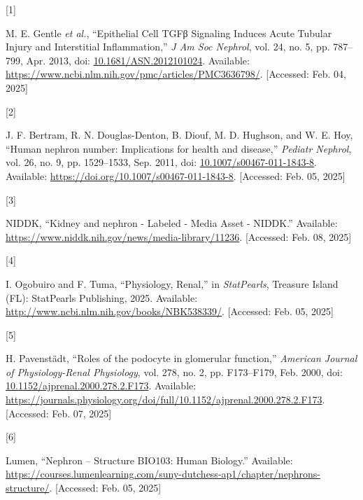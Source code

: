 \documentclass[
  paper=a4,
  ,captions=tableheading
]{scrartcl}
\newlength{\cslhangindent}
\newlength{\csllabelwidth}
\newenvironment{CSLReferences}[2] %
  {\begin{list}{}{%
   \setlength{\itemindent}{0pt}
   \setlength{\leftmargin}{0pt}
   \setlength{\parsep}{0pt}
   \ifodd #1
    \setlength{\leftmargin}{\cslhangindent}
    \setlength{\itemindent}{-1\cslhangindent}
   \fi
   \setlength{\itemsep}{#2\baselineskip}}}
  {\end{list}}
\newcommand{\CSLLeftMargin}[1]{\parbox[t]{\csllabelwidth}{\strut#1\strut}}
\newcommand{\CSLRightInline}[1]{\parbox[t]{\linewidth - \csllabelwidth}{\strut#1\strut}}
\begin{document}
\protect{}\label{refs}
\begin{CSLReferences}{0}{0}
\CSLLeftMargin{{[}1{]} }%
\CSLRightInline{M. E. Gentle \emph{et al.}, {``Epithelial {Cell TGFβ
Signaling Induces Acute Tubular Injury} and {Interstitial
Inflammation},''} \emph{J Am Soc Nephrol}, vol. 24, no. 5, pp. 787--799,
Apr. 2013, doi:
\href{https://doi.org/10.1681/ASN.2012101024}{10.1681/ASN.2012101024}.
Available: \url{https://www.ncbi.nlm.nih.gov/pmc/articles/PMC3636798/}.
{[}Accessed: Feb. 04, 2025{]}}

\CSLLeftMargin{{[}2{]} }%
\CSLRightInline{J. F. Bertram, R. N. Douglas-Denton, B. Diouf, M. D.
Hughson, and W. E. Hoy, {``Human nephron number: Implications for health
and disease,''} \emph{Pediatr Nephrol}, vol. 26, no. 9, pp. 1529--1533,
Sep. 2011, doi:
\href{https://doi.org/10.1007/s00467-011-1843-8}{10.1007/s00467-011-1843-8}.
Available: \url{https://doi.org/10.1007/s00467-011-1843-8}. {[}Accessed:
Feb. 05, 2025{]}}

\CSLLeftMargin{{[}3{]} }%
\CSLRightInline{NIDDK, {``Kidney and nephron - {Labeled} - {Media Asset}
- {NIDDK}.''} Available:
\url{https://www.niddk.nih.gov/news/media-library/11236}. {[}Accessed:
Feb. 08, 2025{]}}

\CSLLeftMargin{{[}4{]} }%
\CSLRightInline{I. Ogobuiro and F. Tuma, {``Physiology, {Renal},''} in
\emph{{StatPearls}}, Treasure Island (FL): StatPearls Publishing, 2025.
Available: \url{http://www.ncbi.nlm.nih.gov/books/NBK538339/}.
{[}Accessed: Feb. 05, 2025{]}}

\CSLLeftMargin{{[}5{]} }%
\CSLRightInline{H. Pavenstädt, {``Roles of the podocyte in glomerular
function,''} \emph{American Journal of Physiology-Renal Physiology},
vol. 278, no. 2, pp. F173--F179, Feb. 2000, doi:
\href{https://doi.org/10.1152/ajprenal.2000.278.2.F173}{10.1152/ajprenal.2000.278.2.F173}.
Available:
\url{https://journals.physiology.org/doi/full/10.1152/ajprenal.2000.278.2.F173}.
{[}Accessed: Feb. 07, 2025{]}}

\CSLLeftMargin{{[}6{]} }%
\CSLRightInline{Lumen, {``Nephron -- {Structure} \textbar{} {BIO103}:
{Human Biology}.''} Available:
\url{https://courses.lumenlearning.com/suny-dutchess-ap1/chapter/nephrons-structure/}.
{[}Accessed: Feb. 05, 2025{]}}


\end{CSLReferences}
\end{document}
